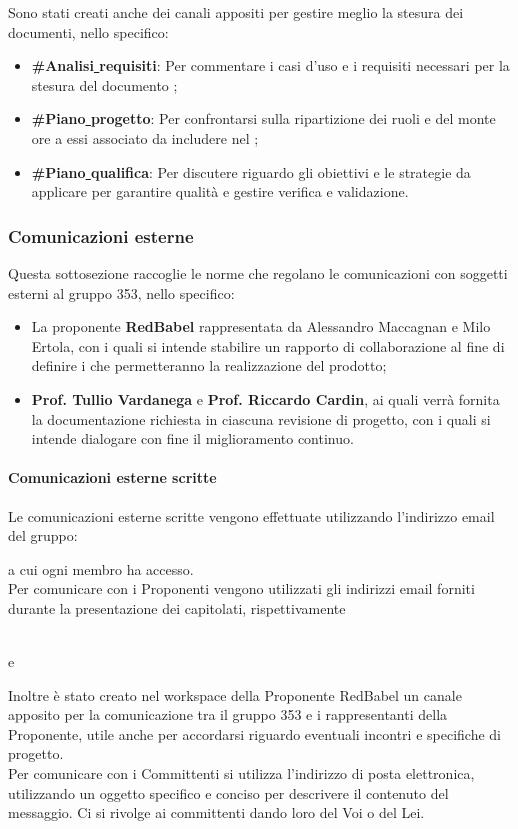 \documentclass[NormeDiProgetto.tex]{subfiles}
\begin{document}
	Sono stati creati anche dei canali appositi per gestire meglio la stesura dei documenti, nello specifico:
	\begin{itemize}
		\item \textbf{\#Analisi\underline{ }requisiti}: Per commentare i casi d'uso e i requisiti necessari per la stesura del documento \adr;
		\item \textbf{\#Piano\underline{ }progetto}: Per confrontarsi sulla ripartizione dei ruoli e del monte ore a essi associato da includere nel \pdp;
		\item \textbf{\#Piano\underline{ }qualifica}: Per discutere riguardo gli obiettivi e le strategie da applicare per garantire qualità e gestire verifica e validazione.
	\end{itemize}
	

	\subsubsection{Comunicazioni esterne}
	Questa sottosezione raccoglie le norme che regolano le comunicazioni con soggetti esterni al gruppo 353, nello specifico:
	\begin{itemize}
		\item La proponente \textbf{RedBabel} rappresentata da Alessandro Maccagnan e Milo Ertola, con i quali si intende stabilire un rapporto di collaborazione al fine di definire i  che permetteranno la realizzazione del prodotto;
		\item \textbf{Prof. Tullio Vardanega} e \textbf{Prof. Riccardo Cardin}, ai quali verrà fornita la documentazione richiesta in ciascuna revisione di progetto, con i quali si intende dialogare con fine il miglioramento continuo.
	\end{itemize}
	\paragraph{Comunicazioni esterne scritte}
	Le comunicazioni esterne scritte vengono effettuate utilizzando l'indirizzo email del gruppo:
	\begin{center}
		\mailleaf
	\end{center}
	a cui ogni membro ha accesso.\\
	Per comunicare con i Proponenti vengono utilizzati gli indirizzi email forniti durante la presentazione dei capitolati, rispettivamente 
	\begin{center}
		 \\
		e\\
		
	\end{center}
	Inoltre è stato creato nel workspace  della Proponente RedBabel un canale apposito per la comunicazione tra il gruppo 353 e i rappresentanti della Proponente, utile anche per accordarsi riguardo eventuali incontri e specifiche di progetto.\\
	Per comunicare con i Committenti si utilizza l'indirizzo di posta elettronica, utilizzando un oggetto specifico e conciso per descrivere il contenuto del messaggio. Ci si rivolge ai committenti dando loro del Voi o del Lei.
	
\end{document}
